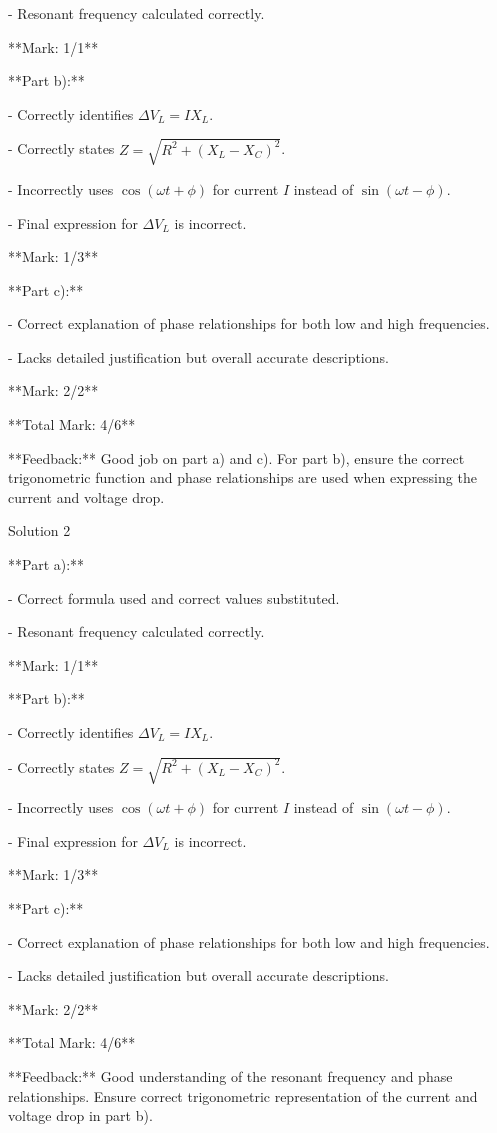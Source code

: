 \documentclass[a4paper,11pt]{article}
\begin{document}
- Resonant frequency calculated correctly.

**Mark: 1/1**

**Part b):**

- Correctly identifies \( \Delta V_L = I X_L \).

- Correctly states \( Z = \sqrt{R^2 + (X_L - X_C)^2} \).

- Incorrectly uses \( \cos(\omega t + \phi) \) for current \( I \) instead of \( \sin(\omega t - \phi) \).

- Final expression for \( \Delta V_L \) is incorrect.

**Mark: 1/3**

**Part c):**

- Correct explanation of phase relationships for both low and high frequencies.

- Lacks detailed justification but overall accurate descriptions.

**Mark: 2/2**

**Total Mark: 4/6**

**Feedback:** Good job on part a) and c). For part b), ensure the correct trigonometric function and phase relationships are used when expressing the current and voltage drop.

Solution 2

**Part a):**

- Correct formula used and correct values substituted.

- Resonant frequency calculated correctly.

**Mark: 1/1**

**Part b):**

- Correctly identifies \( \Delta V_L = I X_L \).

- Correctly states \( Z = \sqrt{R^2 + (X_L - X_C)^2} \).

- Incorrectly uses \( \cos(\omega t + \phi) \) for current \( I \) instead of \( \sin(\omega t - \phi) \).

- Final expression for \( \Delta V_L \) is incorrect.

**Mark: 1/3**

**Part c):**

- Correct explanation of phase relationships for both low and high frequencies.

- Lacks detailed justification but overall accurate descriptions.

**Mark: 2/2**

**Total Mark: 4/6**

**Feedback:** Good understanding of the resonant frequency and phase relationships. Ensure correct trigonometric representation of the current and voltage drop in part b).
\end{document}
